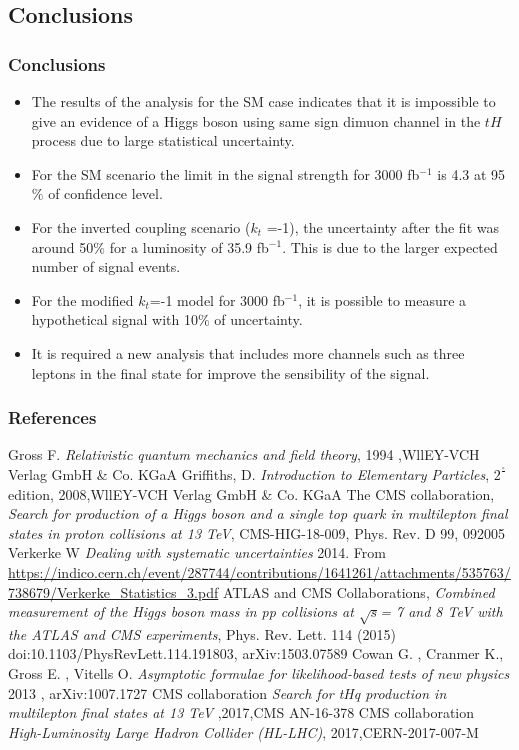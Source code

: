 \documentclass[11pt]{beamer}
\begin{document}
\begin{frame}
	\section{Conclusions}
\frametitle{Conclusions}
\begin{itemize}
\item The results of the analysis for the SM case indicates that it is impossible to give an evidence of a Higgs boson using same sign dimuon channel in the $tH$ process due to large statistical uncertainty.
\item For the SM scenario the limit in the signal strength for 3000 fb$^{-1}$ is 4.3 at 95$\%$ of confidence level.
\item For the inverted coupling scenario ($k_t$ =-1), the uncertainty after the fit was around 50$\%$ for a luminosity of 35.9 fb$^{-1}$. This is due to the larger expected number of signal events.
\item For the modified $k_t$=-1 model for 3000 fb$^{-1}$, it is possible to measure a hypothetical signal with 10$\%$ of uncertainty.
\item It is required a new analysis that includes more channels such as three leptons in the final state for improve the sensibility of the signal.
\end{itemize}
\end{frame}


	\begin{thebibliography}{99}
		
	\begin{frame}
	\tiny
	\frametitle{References}
	
	Gross F. \textit{Relativistic quantum mechanics and field theory}, 1994 ,WllEY-VCH Verlag GmbH \& Co. KGaA
	 Griffiths, D. \textit{Introduction to Elementary Particles}, $2^\frac{\circ}{}$ edition, 2008,WllEY-VCH Verlag GmbH \& Co. KGaA
		The CMS collaboration, \textit{Search for production of a Higgs boson and a single top
	quark in multilepton final states in proton collisions at 13 TeV}, CMS-HIG-18-009, Phys. Rev. D 99, 092005
	Verkerke W \textit{Dealing with systematic uncertainties} 2014. From
\url{https://indico.cern.ch/event/287744/contributions/1641261/attachments/535763/738679/Verkerke_Statistics_3.pdf}
 ATLAS and CMS
Collaborations, \textit{Combined measurement of the Higgs boson mass in
	pp collisions at $\sqrt{s}$= 7 and 8 TeV with the ATLAS and CMS experiments}, Phys. Rev. Lett.
114 (2015) doi:10.1103/PhysRevLett.114.191803, arXiv:1503.07589
 Cowan G. , Cranmer K., Gross E. , Vitells O.\textit{ Asymptotic formulae for
	likelihood-based tests of new physics} 2013 , arXiv:1007.1727
CMS collaboration \textit{Search for tHq production in multilepton final states at 13 TeV} ,2017,CMS AN-16-378
CMS collaboration \textit{High-Luminosity Large Hadron Collider (HL-LHC)}, 2017,CERN-2017-007-M
\end{frame}
\end{thebibliography}
\end{document}
